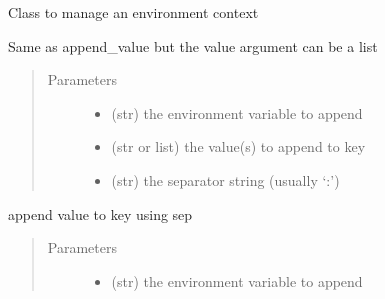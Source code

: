 \documentclass[a4paper,10pt,english]{sphinxmanual}
\begin{document}
\begin{fulllineitems}
\label{\detokenize{apidoc_src/src:src.environment.Environ}}
Class to manage an environment context

\begin{fulllineitems}
\label{\detokenize{apidoc_src/src:src.environment.Environ.append}}
Same as append\_value but the value argument can be a list
\begin{quote}\begin{description}
\item[{Parameters}] \leavevmode\begin{itemize}
\item {} 
 \textendash{} (str) the environment variable to append

\item {} 
 \textendash{} (str or list) the value(s) to append to key

\item {} 
 \textendash{} (str) the separator string (usually ‘:’)

\end{itemize}

\end{description}\end{quote}

\end{fulllineitems}


\begin{fulllineitems}
\label{\detokenize{apidoc_src/src:src.environment.Environ.append_value}}
append value to key using sep
\begin{quote}\begin{description}
\item[{Parameters}] \leavevmode\begin{itemize}
\item {} 
 \textendash{} (str) the environment variable to append


\end{itemize}
\end{description}
\end{quote}
\end{fulllineitems}
\end{fulllineitems}
\end{document}
